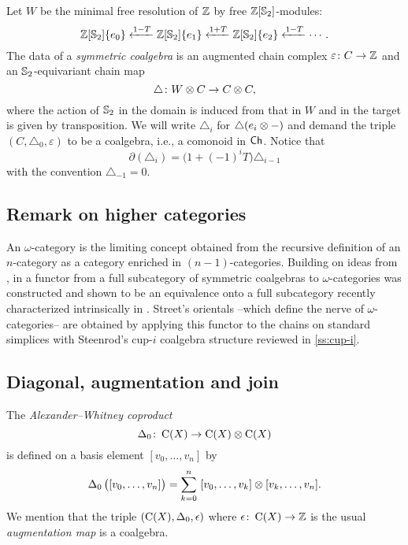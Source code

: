 Let $W$ be the minimal free resolution of $\mathbb{Z}$ by free $\mathbb{Z}[\mathbb{S}_2]$-modules:
\[
\mathbb{Z}[\mathbb{S}_2]\{e_0\} \xleftarrow{1-T} \mathbb{Z}[\mathbb{S}_2]\{e_1\} \xleftarrow{1+T} \mathbb{Z}[\mathbb{S}_2]\{e_2\} \xleftarrow{1-T} \dotsb.
\]
The data of a \textit{symmetric coalgebra} is an augmented chain complex $\varepsilon \colon C \to \mathbb{Z}$ and an $\mathbb{S}_2$-equivariant chain map
\[
\triangle \colon W \otimes C \to C \otimes C,
\]
where the action of $\mathbb{S}_2$ in the domain is induced from that in $W$ and in the target is given by transposition.
We will write $\triangle_i$ for $\triangle(e_i \otimes -)$ and demand the triple $(C, \triangle_0, \varepsilon)$ to be a coalgebra, i.e.,
a comonoid in $\mathsf{Ch}$.
Notice that
\[
\partial(\triangle_i) = \big( 1+(-1)^i T \big) \triangle_{i-1}
\]
with the convention $\triangle_{-1} = 0$.

\subsection{Remark on higher categories}
\label{ss:higher categories}

An $\omega$-category is the limiting concept obtained from the recursive definition of an $n$-category as a category enriched in $(n-1)$-categories.
Building on ideas from \cite{brown1981cubes, kapranov1991polycategory, steiner2004omega}, in \cite{medina2020globular} a functor from a full subcategory of symmetric coalgebras to $\omega$-categories was constructed and shown to be an equivalence onto a full subcategory recently characterized intrinsically in \cite{ozornova2022steiner}.
Street's orientals \cite{street1987orientals} --which define the nerve of $\omega$-categories-- are obtained by applying this functor to the chains on standard simplices with Steenrod's cup-$i$ coalgebra structure reviewed in \cref{ss:cup-i}.

\subsection{Diagonal, augmentation and join}

The \textit{Alexander--Whitney coproduct}
\[
\operatorname{\Delta}_0 \colon \operatorname{C}(X) \to \operatorname{C}(X) \otimes \operatorname{C}(X)
\]
is defined on a basis element $[v_0, \dots, v_n]$ by
\begin{equation*}\label{e:alexander-whitney coalgebra}
	\operatorname{\Delta}_0 \big( [v_0, \dots, v_n] \big) =
	\sum_{k=0}^n \ [v_0, \dots, v_k] \otimes [v_k, \dots, v_n].
\end{equation*}
We mention that the triple $(\operatorname{C}(X), \operatorname{\Delta}_0, \operatorname{\epsilon})$ where $\operatorname{\epsilon} \colon \operatorname{C}(X) \to \mathbb{Z}$ is the usual \textit{augmentation map} is a coalgebra.

